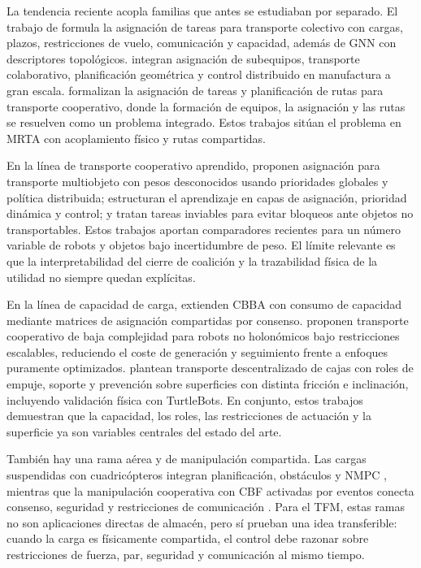 La tendencia reciente acopla familias que antes se estudiaban por separado.
El trabajo de \citet{paul2023collective} formula la asignación de tareas para transporte
colectivo con cargas, plazos, restricciones de vuelo, comunicación y capacidad, además de GNN con descriptores
topológicos. \citet{brown2025assembly} integran asignación de subequipos, transporte
colaborativo, planificación geométrica y control distribuido en manufactura a gran
escala. \citet{zhou2026cttapf} formalizan la asignación de tareas y planificación de rutas
para transporte cooperativo, donde la formación de equipos, la asignación y las rutas se resuelven como un
problema integrado. Estos trabajos sitúan el problema en MRTA con acoplamiento físico y
rutas compartidas.

En la línea de transporte cooperativo aprendido, \citet{shibata2022learning} proponen
asignación para transporte multiobjeto con pesos desconocidos usando prioridades globales
y política distribuida; \citet{naito2024tihdp} estructuran el aprendizaje en capas de
asignación, prioridad dinámica y control; y \citet{shida2024infeasible} tratan tareas
inviables para evitar bloqueos ante objetos no transportables. Estos trabajos aportan
comparadores recientes para un número variable de robots y objetos bajo incertidumbre de
peso. El límite relevante es que la interpretabilidad del cierre de coalición y la
trazabilidad física de la utilidad no siempre quedan explícitas.

En la línea de capacidad de carga, \citet{qiu2024cbpa} extienden CBBA con consumo de
capacidad mediante matrices de asignación compartidas por consenso. \citet{guan2025low}
proponen transporte cooperativo de baja complejidad para robots no holonómicos bajo
restricciones escalables, reduciendo el coste de generación y seguimiento frente a enfoques
puramente optimizados. \citet{bhatt2026box} plantean transporte descentralizado de cajas
con roles de empuje, soporte y prevención sobre superficies con distinta fricción e
inclinación, incluyendo validación física con TurtleBots. En conjunto, estos trabajos
demuestran que la capacidad, los roles, las restricciones de actuación y la superficie ya son variables
centrales del estado del arte.

También hay una rama aérea y de manipulación compartida. Las cargas suspendidas con
cuadricópteros integran planificación, obstáculos y NMPC \citep{kargar2025cable}, mientras
que la manipulación cooperativa con CBF activadas por eventos conecta consenso, seguridad y
restricciones de comunicación \citep{zhuang2026safe}. Para el TFM, estas ramas no son
aplicaciones directas de almacén, pero sí prueban una idea transferible: cuando la carga
es físicamente compartida, el control debe razonar sobre restricciones de fuerza, par,
seguridad y comunicación al mismo tiempo.

